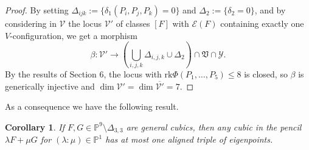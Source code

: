 \documentclass{amsart}
\theoremstyle{plain}
\newtheorem{prop}[lemma]{Proposition}
\newtheorem{corollary}[lemma]{Corollary}
\theoremstyle{definition}
\newtheorem{definition}[lemma]{Definition}
\newcommand{\p}{\mathbb{P}}
\newcommand{\sV}{\mathcal{V}}
\newcommand{\sY}{\mathcal{Y}}
\newcommand{\Eig}[1]{\mathcal{E}\!\left( {#1} \right)}
\newcommand{\rk}{\ensuremath{\mathrm{rk}}}
\begin{document}
{\begin{proof}
By setting $\Delta_{ijk} :=\{\delta_1 (P_i, P_j,P_k)=0\}$
and $\Delta_2:=\{\delta_2=0\}$, and by considering in $\sV$ the locus
$\mathcal{V}'$ of classes $[F]$ with $\Eig{F}$ containing exactly one $V$-configuration,
we get a morphism
$$
\beta : \mathcal{V}' \to (\bigcup_{i,j,k}\Delta_{i,j,k} \cup \Delta_2) \cap \mathfrak{V} \cap \sY.
$$
By the results of Section 6, the locus with $\rk \Phi(P_1, \dots,P_5)\le 8$ is closed, so $\beta$ is generically injective and $\dim \mathcal{V}'=\dim \overline {\mathcal{V}'}=7$.
%
\end{proof}
 As a consequence we have the following result.
\begin{corollary}
\label{lemma:pencil_one_aligned}
 If $F,G \in \p^9 \setminus \Delta_{3,3}$ are general cubics, then any cubic in the pencil $\lambda F + \mu G$ for $(\lambda: \mu) \in \p^1$ has at most one aligned triple of eigenpoints.
\end{corollary}





%

}
\end{document}
